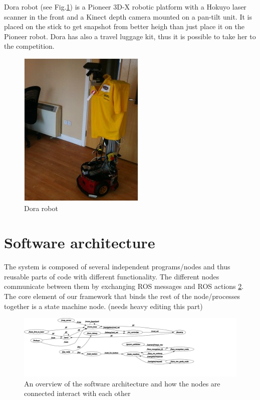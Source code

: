 \documentclass[conference]{IEEEtran}
\begin{document}
Dora robot (see Fig.\ref{fig:dora}) is a Pioneer 3D-X robotic platform with a Hokuyo laser scanner in the front and a Kinect depth camera mounted on a pan-tilt unit. It is placed on the stick to get snapshot from better heigh than just place it on the Pioneer robot. Dora has also a travel luggage kit, thus it is possible to take her to the competition.


\begin{figure}[!t]
\centering
\includegraphics[width=3.in]{dorafinal.jpg}
\caption{Dora robot}
\label{fig:dora}
\end{figure}

\section{Software architecture}
The system is composed of several independent programs/nodes and thus reusable parts of code with different functionality. The different nodes communicate between them by exchanging ROS messages and ROS actions \ref{fig:nodes}. The core element of our framework that binds the rest of the node/processes together is a state machine node. (needs heavy editing this part)

\begin{figure}[!t]
\centering
\includegraphics[width=\textwidth]{nodes.png}
\caption{An overview of the software architecture and how the nodes are connected interact with each other}
\label{fig:nodes}
\end{figure}
\end{document}
